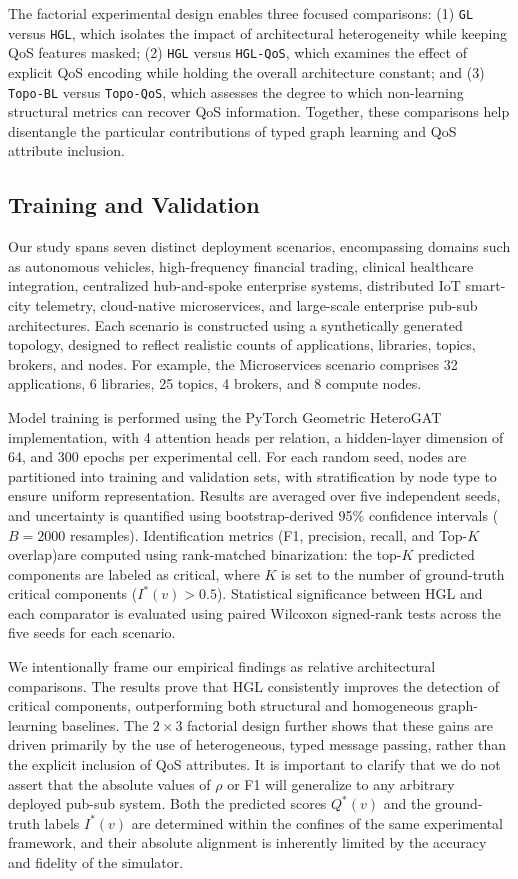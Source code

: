 \documentclass[sigconf,9pt,anonymous]{acmart}
\begin{document}
The factorial experimental design enables three focused comparisons: (1) \texttt{GL} versus \texttt{HGL}, which isolates the impact of architectural heterogeneity while keeping QoS features masked; (2) \texttt{HGL} versus \texttt{HGL-QoS}, which examines the effect of explicit QoS encoding while holding the overall architecture constant; and (3) \texttt{Topo-BL} versus \texttt{Topo-QoS}, which assesses the degree to which non-learning structural metrics can recover QoS information. Together, these comparisons help disentangle the particular contributions of typed graph learning and QoS attribute inclusion.

\subsection{Training and Validation}

Our study spans seven distinct deployment scenarios, encompassing domains such as autonomous vehicles, high-frequency financial trading, clinical healthcare integration, centralized hub-and-spoke enterprise systems, distributed IoT smart-city telemetry, cloud-native microservices, and large-scale enterprise pub-sub architectures. Each scenario is constructed using a synthetically generated topology, designed to reflect realistic counts of applications, libraries, topics, brokers, and nodes. For example, the Microservices scenario comprises 32 applications, 6 libraries, 25 topics, 4 brokers, and 8 compute nodes.

Model training is performed using the PyTorch Geometric HeteroGAT implementation, with 4 attention heads per relation, a hidden-layer dimension of 64, and 300 epochs per experimental cell. For each random seed, nodes are partitioned into training and validation sets, with stratification by node type to ensure uniform representation. Results are averaged over five independent seeds, and uncertainty is quantified using bootstrap-derived 95\% confidence intervals ($B=2000$ resamples). Identification metrics (F1, precision, recall, and Top-$K$ overlap)are computed using rank-matched binarization: the top-$K$ predicted components are labeled as critical, where $K$ is set to the number of ground-truth critical components ($I^*(v)>0.5$). Statistical significance between HGL and each comparator is evaluated using paired Wilcoxon signed-rank tests across the five seeds for each scenario.

We intentionally frame our empirical findings as relative architectural comparisons. The results prove that HGL consistently improves the detection of critical components, outperforming both structural and homogeneous graph-learning baselines. The $2\times3$ factorial design further shows that these gains are driven primarily by the use of heterogeneous, typed message passing, rather than the explicit inclusion of QoS attributes. It is important to clarify that we do not assert that the absolute values of $\rho$ or F1 will generalize to any arbitrary deployed pub-sub system. Both the predicted scores $Q^*(v)$ and the ground-truth labels $I^*(v)$ are determined within the confines of the same experimental framework, and their absolute alignment is inherently limited by the accuracy and fidelity of the simulator.
\end{document}
